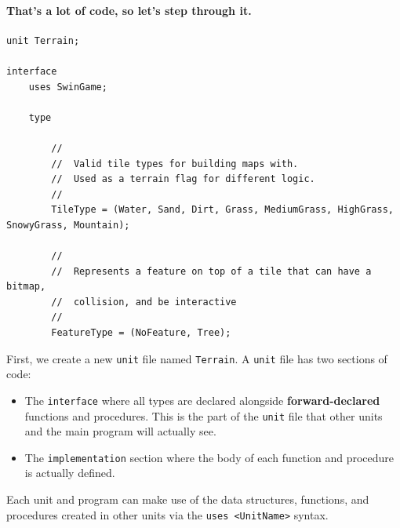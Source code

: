 \documentclass{article}
\begin{document}
\paragraph{That's a lot of code, so let's step through it.}\mbox{}

\begin{verbatim}
unit Terrain;

interface
	uses SwinGame;

	type

		//
		//	Valid tile types for building maps with.
		//	Used as a terrain flag for different logic.
		//
		TileType = (Water, Sand, Dirt, Grass, MediumGrass, HighGrass, SnowyGrass, Mountain);

		//
		//	Represents a feature on top of a tile that can have a bitmap,
		//	collision, and be interactive
		//
		FeatureType = (NoFeature, Tree);
\end{verbatim}

First, we create a new \texttt{unit} file named \texttt{Terrain}. A \texttt{unit} file has two sections of code: 

\begin{itemize}

\item
The \texttt{interface} where all types are declared alongside \textbf{forward-declared} functions and procedures. This is the part of the \texttt{unit} file that other units and the main program will actually see.

\item
The  \texttt{implementation} section where the body of each function and procedure is actually defined.

\end{itemize}

Each unit and program can make use of the data structures, functions, and procedures created in other units via the \texttt{uses <UnitName>} syntax.
\end{document}

